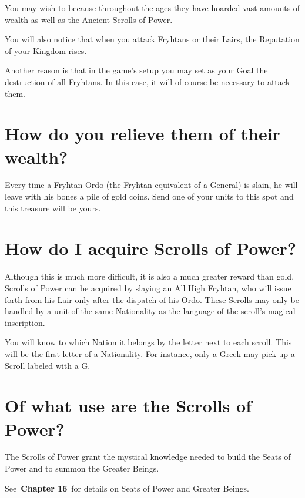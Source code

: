 
You may wish to because throughout the ages they have hoarded vast amounts of wealth as well as the Ancient Scrolls of Power.

You will also notice that when you attack Fryhtans or their Lairs, the Reputation of your Kingdom rises.

Another reason is that in the game’s setup you may set as your Goal the destruction of all Fryhtans. In this case, it will of course be necessary to attack them.

\section{How do you relieve them of their wealth?}

Every time a Fryhtan Ordo (the Fryhtan equivalent of a General) is slain, he will leave with his bones a pile of gold coins. Send one of your units to this spot and this treasure will be yours.

\section{How do I acquire Scrolls of Power?}

Although this is much more difficult, it is also a much greater reward than gold. Scrolls of Power can be acquired by slaying an All High Fryhtan, who will issue forth from his Lair only after the dispatch of his Ordo. These Scrolls may only be handled by a unit of the same Nationality as the language of the scroll’s magical inscription.

You will know to which Nation it belongs by the letter next to each scroll. This will be the first letter of a Nationality. For instance, only a Greek may pick up a Scroll labeled with a G.

\section{Of what use are the Scrolls of Power?}

The Scrolls of Power grant the mystical knowledge needed to build the Seats of Power and to summon the Greater Beings.

See \textbf{Chapter 16} for details on Seats of Power and Greater Beings.